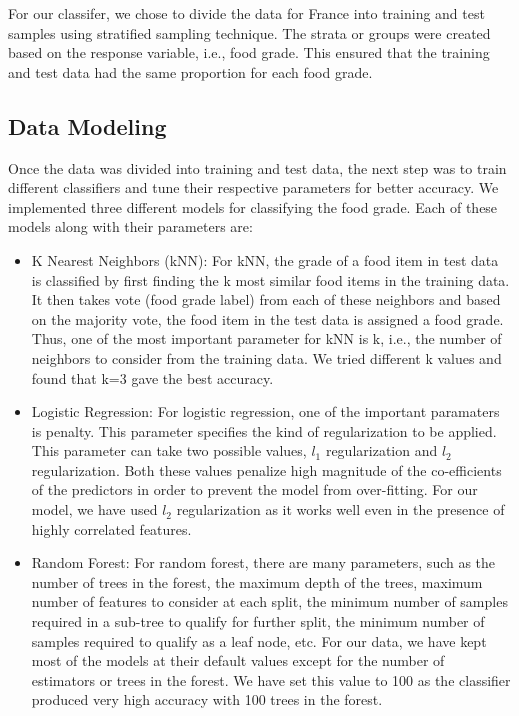 \documentclass[sigconf]{acmart}
\begin{document}
For our classifer, we chose to divide the data for France into training and test samples using stratified sampling technique. The strata or groups were created based on the response variable, i.e., food grade. This ensured that the training and test data had the same proportion for each food grade.

\subsection{Data Modeling}
Once the data was divided into training and test data, the next step was to train different classifiers and tune their respective parameters for better accuracy. We implemented three different models for classifying the food grade. Each of these models along with their parameters are:

\begin{itemize}
	\item K Nearest Neighbors (kNN): For kNN, the grade of a food item in test data is classified by first finding the k most similar food items in the training data. It then takes vote (food grade label) from each of these neighbors and based on the majority vote, the food item in the test data is assigned a food grade. Thus, one of the most important parameter for kNN is k, i.e., the number of neighbors to consider from the training data. We tried different k values and found that k=3 gave the best accuracy.
	\item Logistic Regression: For logistic regression, one of the important paramaters is penalty. This parameter specifies the kind of regularization to be applied. This parameter can take two possible values, $l_1$ regularization and $l_2$ regularization. Both these values penalize high magnitude of the co-efficients of the predictors in order to prevent the model from over-fitting. For our model, we have used $l_2$ regularization as it works well even in the presence of highly correlated features. 
	\item Random Forest: For random forest, there are many parameters, such as the number of trees in the forest, the maximum depth of the trees, maximum number of features to consider at each split, the minimum number of samples required in a sub-tree to qualify for further split, the minimum number of samples required to qualify as a leaf node, etc. For our data, we have kept most of the models at their default values except for the number of estimators or trees in the forest. We have set this value to 100 as the classifier produced very high accuracy with 100 trees in the forest.
\end{itemize}
\end{document}
